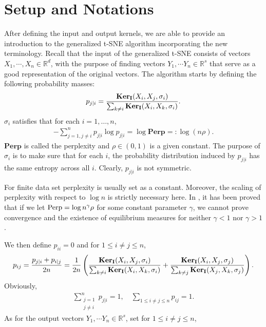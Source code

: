 \section{Setup and Notations} \label{tsne:sec:setup}
After defining the input and output kernels, we are able to provide an
introduction to the generalized t-SNE algorithm incorporating the new
terminology. Recall that the input of the generalized t-SNE consists of vectors
$X_1, \cdots, X_n \in \mathbb{R}^d$, with the purpose of finding vectors $Y_1,
    \cdots Y_n \in \mathbb{R}^s$ that serve as a good representation of the
original vectors. The algorithm starts by defining the following probability
masses:
\begin{align}
    p_{j|i} = \frac{\mathbf{Ker}_{\mathbf{I}}(X_i,X_j,\sigma_i)}{\sum_{k \neq i} \mathbf{Ker}_{\mathbf{I}}(X_i,X_k,\sigma_i)}.
\end{align}
$\sigma_i$ satisfies that for each $i = 1, \dots, n$,
\begin{align}
    -\sum_{j = 1, j \neq i}^n p_{j|i} \log p_{j|i} = \log \textbf{Perp} =: \log (n \rho).
\end{align}
$\textbf{Perp}$ is called the perplexity and $\rho \in (0,1)$ is a given constant. The purpose of $\sigma_i$ is to make sure that for each $i$, the probability distribution induced by $p_{j|i}$ has the same entropy across all $i$. Clearly, $p_{j|i}$ is not symmetric.
\begin{remark}
    For finite data set perplexity is usually set as a constant. Moreover, the scaling of perplexity with respect to $\log n$ is strictly necessary here. In \cite{murray2024largedatalimitsscaling}, it has been proved that if we let $\textbf{\normalfont Perp} = \log n^{\gamma} \rho$ for some constant parameter $\gamma$, we cannot prove convergence and the existence of equilibrium measures for neither $\gamma<1$ nor $\gamma >1$.
\end{remark}
We then define $p_{ii} = 0$ and for $1 \leq i \neq j \leq n$,
\begin{align}
    p_{ij} = \frac{p_{j|i} + p_{i|j}}{2n} = \frac{1}{2n}\left(\frac{\mathbf{Ker}_{\mathbf{I}}(X_i,X_j,\sigma_i)}{\sum_{k \neq i} \mathbf{Ker}_{\mathbf{I}}(X_i,X_k,\sigma_i)}+\frac{\mathbf{Ker}_{\mathbf{I}}(X_i,X_j,\sigma_j)}{\sum_{k \neq j} \mathbf{Ker}_{\mathbf{I}}(X_j,X_k,\sigma_j)}\right).
\end{align}
Obviously,
\begin{align}
    \sum_{\substack{j = 1 \\ j \neq i}}^n p_{j|i} = 1, \quad \sum_{1 \leq i \neq j \leq n} p_{ij} = 1.
\end{align}
As for the output vectors $Y_1, \cdots Y_n \in \mathbb{R}^s$, set for $1 \leq i \neq j \leq n$,
